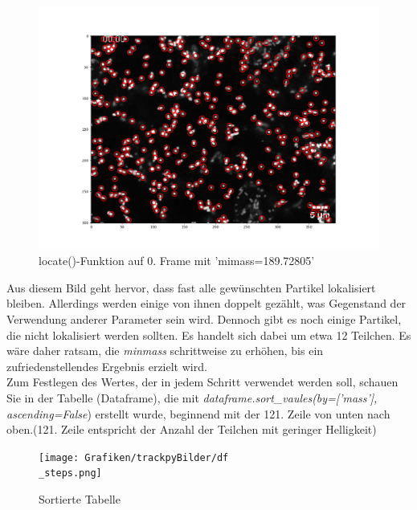 \begin{enumerate}
\begin{figure}[H]
    \centering
    \includegraphics[scale=0.35]{Grafiken/trackpyBilder/locate_with_minmass_01.png}
    \caption{locate()-Funktion auf 0. Frame mit 'mimass=189.72805'}
    \label{fig:kap3_m=189}
\end{figure}

Aus diesem Bild geht hervor, dass fast alle gewünschten Partikel lokalisiert bleiben. Allerdings werden einige von ihnen doppelt gezählt, was Gegenstand der Verwendung anderer Parameter sein wird. Dennoch gibt es noch einige Partikel, die nicht lokalisiert werden sollten. Es handelt sich dabei um etwa 12 Teilchen. Es wäre daher ratsam, die \textit{minmass} schrittweise zu erhöhen, bis ein zufriedenstellendes Ergebnis erzielt wird.\\
Zum Festlegen des Wertes, der in jedem Schritt verwendet werden soll, schauen Sie in der Tabelle (Dataframe), die mit \textit{dataframe.sort\_vaules(by=['mass'], ascending=False}) erstellt wurde, beginnend mit der 121. Zeile von unten nach oben.(121. Zeile entspricht der Anzahl der Teilchen mit geringer Helligkeit)

\begin{figure}[H]
    \centering
    \texttt{[image: Grafiken/trackpyBilder/df\\\_steps.png]}
    \caption{Sortierte Tabelle}
    \label{fig:kap3_sortDataframes}
\end{figure}


\end{enumerate}
